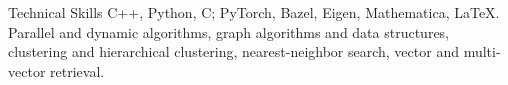 
\begin{rubricicon}{\faTools}{Technical Skills}
    C++, Python, C; PyTorch, Bazel, Eigen, Mathematica, \LaTeX.
    Parallel and dynamic algorithms, graph algorithms and data structures, clustering and hierarchical clustering, nearest-neighbor search, vector and multi-vector retrieval.
\end{rubricicon}
